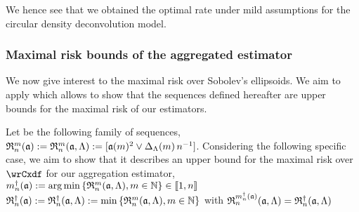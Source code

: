 We hence see that we obtained the optimal rate under mild assumptions for the circular density deconvolution model.

\subsubsection{Maximal risk bounds of the aggregated estimator}\label{au:mrb}
We now give interest to the maximal risk over Sobolev's ellipsoids.
We aim to apply  which allows to show that the sequences defined hereafter are upper bounds for the maximal risk of our estimators.
\begin{de*}
  Let be the following family of sequences,
  $\daRa{\Di}{(\xdfCw[])}:=\daRa{\Di}{(\xdfCw[],\Lambda)}:=[\xdfCw^2\vee \DipenSv\,\ssY^{-1}]$.
Considering the following specific case, we aim to show that it describes an upper bound for the maximal risk over $\rwCxdf$ for our aggregation estimator,
    $\aDi{\ssY}(\xdfCw[]):=\argmin\Nset[\Di\in\Nz]{\daRa{\Di}{(\xdfCw[],\Lambda)}}\in\nset{1,\ssY}$\\
    $\naRa{(\xdfCw[])}:=\naRa{(\xdfCw[],\Lambda)}:=\min\Nset[\Di\in\Nz]{\daRa{\Di}{(\xdfCw[],\Lambda)}}$
    with $\daRa{\aDi{\ssY}(\xdfCw[])}{(\xdfCw[],\Lambda)}=\naRa{(\xdfCw[],\Lambda)}$
\assEnd
\end{de*}

